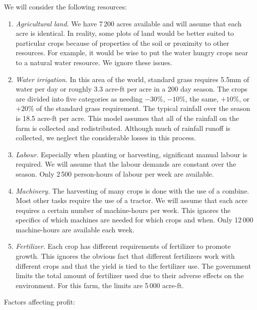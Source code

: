 \documentclass[letter]{article}
\begin{document}
We will consider the following resources:



\begin{enumerate}
	\item \textit{Agricultural land.} We have 7\,200 acres available and will assume that each acre is identical. In reality, some plots of land would be better suited to particular crops because of properties of the soil or proximity to other resources. For example, it would be wise to put the water hungry crops near to a natural water resource. We ignore these issues.

	\item \textit{Water irrigation.} In this area of the world, standard grass requires 5.5mm of water per day or roughly 3.3 acre-ft per acre in a 200 day season. The crops are divided into five categories as needing $-30\%$, $-10\%$, the same, $+10\%$, or $+20\%$ of the standard grass requirement. The typical rainfall over the season is 18.5 acre-ft per acre. This model assumes that all of the rainfall on the farm is collected and redistributed. Although much of rainfall runoff is collected, we neglect the considerable losses in this process.
	
	\item \textit{Labour.} Especially when planting or harvesting, significant manual labour is required. We will assume that the labour demands are constant over the season. Only 2\,500 person-hours of labour per week are available.
	
	\item \textit{Machinery.} The harvesting of many crops is done with the use of a combine. Most other tasks require the use of a tractor. We will assume that each acre requires a certain number of machine-hours per week. This ignores the specifics of which machines are needed for which crops and when. Only 12\,000 machine-hours are available each week.



	\item \textit{Fertilizer.} Each crop has different requirements of fertilizer to promote growth. This ignores the obvious fact that different fertilizers work with different crops and that the yield is tied to the fertilizer use. The government limits the total amount of fertilizer used due to their adverse effects on the environment. For this farm, the limits are 5\,000 acre-ft.
\end{enumerate}


Factors affecting profit:
\end{document}
